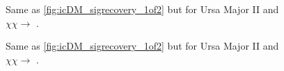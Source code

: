 \begin{figure}[t]
    \caption{Same as \cref{fig:icDM_sigrecovery_1of2} but for Ursa Major II and  $\chi\chi \rightarrow$ .}
    \label{fig:apdx_UMa2tt_sigrecovery}
\end{figure}

\begin{figure}[t]
    \caption{Same as \cref{fig:icDM_sigrecovery_1of2} but for Ursa Major II and  $\chi\chi \rightarrow$ \parpar{\nu_\mu}.}
    \label{fig:apdx_UMa2numu_sigrecovery}
\end{figure}


